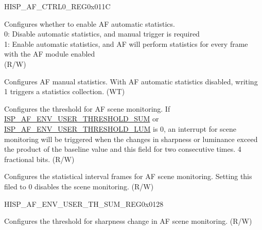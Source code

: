 \begin{register}{H}{ISP\_AF\_CTRL0\_REG}{0x011C}\label{regdesc:ISPAFCTRL0REG}
%
%
%
%
%
%
%
%
\regnewline%
\begin{regdesc}\begin{reglist}
\label{fielddesc:ISPAFAUTOUPDATE}\item [ISP\_AF\_AUTO\_UPDATE] Configures whether to enable AF automatic statistics.\\0: Disable automatic statistics, and manual trigger is required\\1: Enable automatic statistics, and AF will perform statistics for every frame with the AF module enabled\\(R/W)
\label{fielddesc:ISPAFMANUALUPDATE}\item [ISP\_AF\_MANUAL\_UPDATE] Configures AF manual statistics. With AF automatic statistics disabled, writing 1 triggers a statistics collection. (WT)
\label{fielddesc:ISPAFENVTHRESHOLD}\item [ISP\_AF\_ENV\_THRESHOLD] Configures the threshold for AF scene monitoring. If \hyperref[fielddesc:ISPAFENVUSERTHRESHOLDSUM]{ISP\_AF\_ENV\_USER\_THRESHOLD\_SUM} or \hyperref[fielddesc:ISPAFENVUSERTHRESHOLDLUM]{ISP\_AF\_ENV\_USER\_THRESHOLD\_LUM} is 0, an interrupt for scene monitoring will be triggered when the changes in sharpness or luminance exceed the product of the baseline value and this field for two consecutive times. 4 fractional bits. (R/W)
\label{fielddesc:ISPAFENVPERIOD}\item [ISP\_AF\_ENV\_PERIOD] Configures the statistical interval frames for AF scene monitoring. Setting this filed to 0 disables the scene monitoring. (R/W)
\end{reglist}\end{regdesc}
\end{register}






\begin{register}{H}{ISP\_AF\_ENV\_USER\_TH\_SUM\_REG}{0x0128}\label{regdesc:ISPAFENVUSERTHSUMREG}
%
\regnewline%
\begin{regdesc}\begin{reglist}
\label{fielddesc:ISPAFENVUSERTHRESHOLDSUM}\item [ISP\_AF\_ENV\_USER\_THRESHOLD\_SUM] Configures the threshold for sharpness change in AF scene monitoring. (R/W)
\end{reglist}\end{regdesc}
\end{register}


